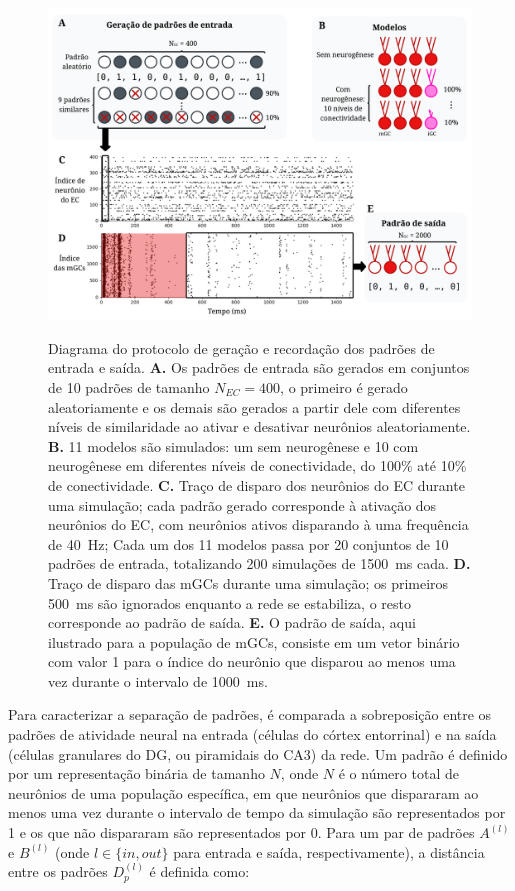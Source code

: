 \begin{figure}[H]
    \centering
    \caption{Diagrama do protocolo de geração e recordação dos padrões de entrada e saída.
    \textbf{A.} Os padrões de entrada são gerados em conjuntos de 10 padrões de tamanho $N_{EC} = 400$, o primeiro é gerado
    aleatoriamente e os demais são gerados a partir dele com diferentes níveis de similaridade ao ativar e desativar neurônios
    aleatoriamente.
    \textbf{B.} 11 modelos são simulados: um sem neurogênese e 10 com neurogênese em diferentes níveis de conectividade, do 100\%
    até 10\% de conectividade.
    \textbf{C.} Traço de disparo dos neurônios do EC durante uma simulação; cada padrão gerado corresponde à ativação dos neurônios
    do EC, com neurônios ativos disparando à uma frequência de \SI{40}{\hertz}; Cada um dos 11 modelos passa por 20 conjuntos de
    10 padrões de entrada, totalizando 200 simulações de \SI{1500}{\milli\second} cada.
    \textbf{D.} Traço de disparo das mGCs durante uma simulação; os primeiros \SI{500}{\milli\second} são ignorados enquanto a rede
    se estabiliza, o resto corresponde ao padrão de saída.
    \textbf{E.} O padrão de saída, aqui ilustrado para a população de mGCs, consiste em um vetor binário com valor 1 para o índice
    do neurônio que disparou ao menos uma vez durante o intervalo de \SI{1000}{\milli\second}.}
    \includegraphics[width=\textwidth]{figuras/diagrama_entrada_saida}
    \label{fig:diagrama_entrada_saida}
\end{figure}

Para caracterizar a separação de padrões, é comparada a sobreposição entre os padrões de atividade neural na entrada (células do
córtex entorrinal) e na saída (células granulares do DG, ou piramidais do CA3) da rede. Um padrão é definido por um representação
binária de tamanho $N$, onde $N$ é o número total de neurônios de uma população específica, em que neurônios que dispararam ao
menos uma vez durante o intervalo de tempo da simulação são representados por 1 e os que não dispararam são representados por 0.
Para um par de padrões $A^{(l)}$ e $B^{(l)}$ (onde $l \in \{in, out\}$ para entrada e saída, respectivamente), a distância entre
os padrões $D_p^{(l)}$ é definida como:

